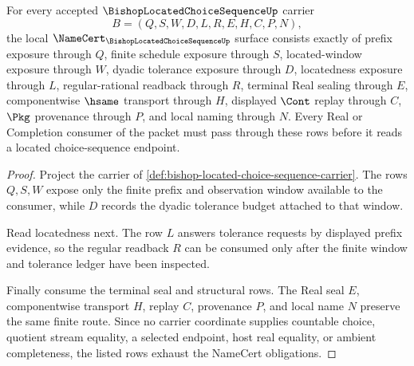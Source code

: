 \begin{theorem}
\label{thm:bishop-located-choice-sequence-namecert-obligations}
For every accepted $\BishopLocatedChoiceSequenceUp$ carrier
$$
B=(Q,S,W,D,L,R,E,H,C,P,N),
$$
the local $\NameCert_{\BishopLocatedChoiceSequenceUp}$ surface consists exactly of prefix exposure through $Q$, finite schedule exposure through $S$, located-window exposure through $W$, dyadic tolerance exposure through $D$, locatedness exposure through $L$, regular-rational readback through $R$, terminal Real sealing through $E$, componentwise $\hsame$ transport through $H$, displayed $\Cont$ replay through $C$, $\Pkg$ provenance through $P$, and local naming through $N$. Every Real or Completion consumer of the packet must pass through these rows before it reads a located choice-sequence endpoint.
\end{theorem}
\begin{proof}
Project the carrier of \autoref{def:bishop-located-choice-sequence-carrier}. The rows $Q,S,W$ expose only the finite prefix and observation window available to the consumer, while $D$ records the dyadic tolerance budget attached to that window.

Read locatedness next. The row $L$ answers tolerance requests by displayed prefix evidence, so the regular readback $R$ can be consumed only after the finite window and tolerance ledger have been inspected.

Finally consume the terminal seal and structural rows. The Real seal $E$, componentwise transport $H$, replay $C$, provenance $P$, and local name $N$ preserve the same finite route. Since no carrier coordinate supplies countable choice, quotient stream equality, a selected endpoint, host real equality, or ambient completeness, the listed rows exhaust the NameCert obligations.
\end{proof}

